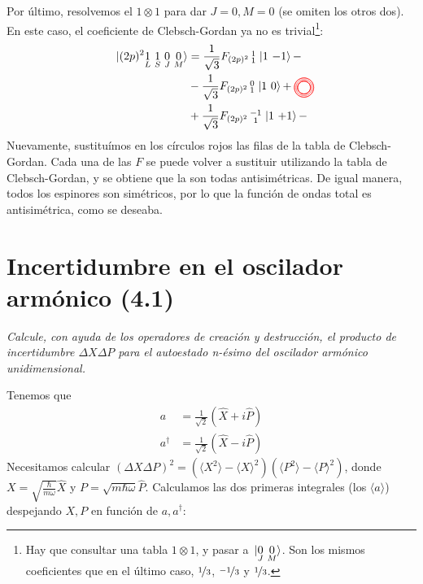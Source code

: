 Por último, resolvemos el $1\otimes 1$ para dar $J=0,M=0$ (se omiten los
otros dos). En este caso, el coeficiente de Clebsch-Gordan ya no es
trivial\footnote{Hay que consultar una tabla $1\otimes 1$, y pasar a
$\ket*{\underset{J}{0}\ \underset{M}{0}}$. Son los mismos coeficientes
que en el último caso, $\nicefrac{1}{3}$, $\nicefrac{-1}{3}$ y
$\nicefrac{1}{3}$.}:
\begin{equation}
  \begin{split}
    \ket*{(2p)^2\underset{L}{1}\ \underset{S}{1}\ \underset{J}{0}\
      \underset{M}{0}} &= \frac{1}{\sqrt{3}} F_{(2p)^2}\smqty{1\tikzmark{a}\\1}
    \ket{1 \ {-1\tikzmark{b}}} - \\
& -\frac{1}{\sqrt{3}} F_{(2p)^2}\smqty{0\tikzmark{c}\\1}
    \ket{1 \ {0\tikzmark{d}}} + \\
& +\frac{1}{\sqrt{3}} F_{(2p)^2}\smqty{-1\tikzmark{e}\\1}
    \ket{1 \ {+1\tikzmark{f}}} - \\
  \end{split}
  \tikz[overlay,remember picture]
  {
   \draw[color=red,thin] ([xshift=-3pt,yshift=2.3pt]a) circle (0.2cm);
   \draw[color=red,thin] ([xshift=-3pt,yshift=2.3pt]b) circle (0.3cm);
   \draw[color=red,thin] ([xshift=-3pt,yshift=2.3pt]c) circle (0.2cm);
   \draw[color=red,thin] ([xshift=-3pt,yshift=2.3pt]d) circle (0.25cm);
   \draw[color=red,thin] ([xshift=-3pt,yshift=2.3pt]e) circle (0.2cm);
   \draw[color=red,thin] ([xshift=-3pt,yshift=2.3pt]f) circle (0.3cm);
    }
\end{equation}
Nuevamente, sustituímos en los círculos rojos las filas de la tabla de
Clebsch-Gordan. Cada una de las $F$ se puede volver a sustituir
utilizando la tabla de Clebsch-Gordan, y se obtiene que la son todas
antisimétricas. De igual manera, todos los espinores son simétricos,
por lo que la función de ondas total es antisimétrica, como se deseaba.

\chapter{Incertidumbre en el oscilador armónico (4.1)}
\begin{tcolorbox}[halign=left]
  \emph{
    Calcule, con ayuda de los operadores de creación y
    destrucción, el producto de incertidumbre $\Delta X \Delta P$ para
  el autoestado n-ésimo del oscilador armónico unidimensional.}
\end{tcolorbox}
Tenemos que
\begin{align}
a &= \frac{1}{\sqrt{2}} ( \hat{X}+i\hat{P}) \\
a^\dagger &= \frac{1}{\sqrt{2}} ( \hat{X}-i\hat{P}) 
\end{align}
Necesitamos calcular $(\Delta X \Delta P)^2=(\langle X^2 \rangle-\langle
X\rangle^2)(\langle P^2 \rangle-\langle P\rangle^2)$, donde $X =
\sqrt{\frac{\hbar}{m\omega}}\hat{X}$ y $P = \sqrt{m \hbar
  \omega}\hat{P} $. Calculamos las dos primeras integrales (los
$\langle a \rangle$) despejando $X,P$ en función de $a,a^\dagger$:

